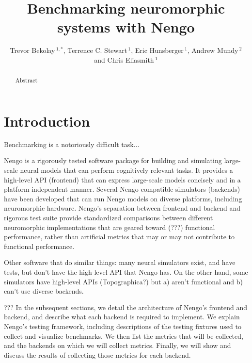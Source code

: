 \documentclass{frontiersSCNS}
\def\keyFont{\fontsize{8}{11}\helveticabold }
\def\firstAuthorLast{Bekolay {et~al.}}
\def\Authors{Trevor Bekolay\,$^{1,*}$,
  Terrence C. Stewart\,$^{1}$,
  Eric Hunsberger\,$^1$,
  Andrew Mundy\,$^2$ and
  Chris Eliasmith\,$^1$}
\begin{document}
\onecolumn
{}

\title[Benchmarking neuromorphic systems with Nengo]{Benchmarking neuromorphic systems with Nengo}
\author[\firstAuthorLast ]{\Authors}
\address{}
\correspondance{}
\extraAuth{}

\maketitle

\begin{abstract}

  Abstract

  \tiny
  \keyFont{ \section{Keywords:}  }
\end{abstract}

\section{Introduction}

Benchmarking is a notoriously difficult task...

Nengo is a rigorously tested software package
for building and simulating
large-scale neural models
that can perform cognitively relevant tasks.
It provides a high-level API (frontend)
that can express large-scale models concisely
and in a platform-independent manner.
Several Nengo-compatible simulators (backends)
have been developed that can
run Nengo models on diverse platforms,
including neuromorphic hardware.
Nengo's separation between frontend and backend
and rigorous test suite
provide standardized comparisons
between different neuromorphic implementations
that are geared toward (???) functional performance,
rather than artificial metrics
that may or may not contribute to functional performance.

Other software that do similar things:
many neural simulators exist, and have tests,
but don't have the high-level API
that Nengo has.
On the other hand, some simulators
have high-level APIs
(Topographica?) but a) aren't functional
and b) can't use diverse backends.

??? In the subsequent sections,
we detail the architecture of Nengo's
frontend and backend,
and describe what each backend
is required to implement.
We explain Nengo's testing framework,
including descriptions of the testing fixtures
used to collect and visualize benchmarks.
We then list the metrics that will be collected,
and the backends on which we will collect metrics.
Finally, we will show and discuss
the results of collecting those metrics
for each backend.
\end{document}
